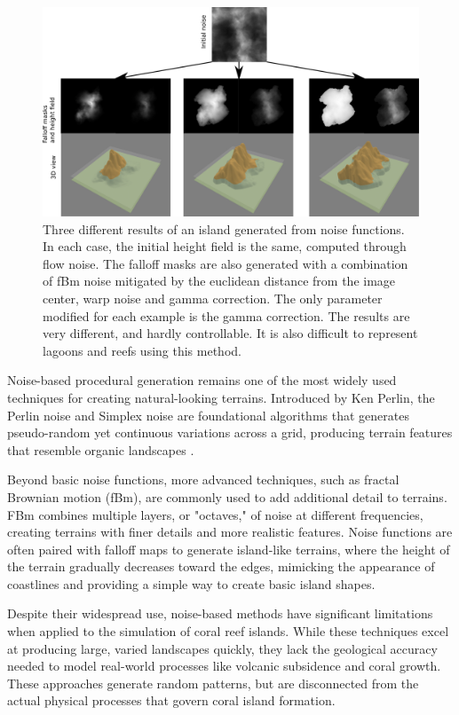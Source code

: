 \begin{figure}[ht]
    \centering
    \includegraphics[width = \linewidth]{noise_examples3.pdf}
    \caption{Three different results of an island generated from noise functions. In each case, the initial height field is the same, computed through flow noise. The falloff masks are also generated with a combination of fBm noise mitigated by the euclidean distance from the image center, warp noise and gamma correction. The only parameter modified for each example is the gamma correction. The results are very different, and hardly controllable. It is also difficult to represent lagoons and reefs using this method.}
    \label{fig:coral-island_noise-example}
\end{figure}
Noise-based procedural generation remains one of the most widely used techniques for creating natural-looking terrains. Introduced by Ken Perlin, the Perlin noise and Simplex noise are foundational algorithms that generates pseudo-random yet continuous variations across a grid, producing terrain features that resemble organic landscapes \cite{Perlin1985,Perlin2001}.

Beyond basic noise functions, more advanced techniques, such as fractal Brownian motion (fBm), are commonly used to add additional detail to terrains. FBm combines multiple layers, or "octaves," of noise at different frequencies, creating terrains with finer details and more realistic features. Noise functions are often paired with falloff maps to generate island-like terrains, where the height of the terrain gradually decreases toward the edges, mimicking the appearance of coastlines and providing a simple way to create basic island shapes.

Despite their widespread use, noise-based methods have significant limitations when applied to the simulation of coral reef islands. While these techniques excel at producing large, varied landscapes quickly, they lack the geological accuracy needed to model real-world processes like volcanic subsidence and coral growth. These approaches generate random patterns, but are disconnected from the actual physical processes that govern coral island formation.

